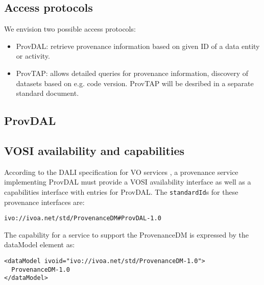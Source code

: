 \subsection{Access protocols}
\label{sec:access_protocols}
We envision two possible access protocols:
\begin{itemize}
\item ProvDAL: retrieve provenance information based on given ID of a data entity or activity.
\item ProvTAP: allows detailed queries for provenance information, discovery of datasets based on e.g. code version. ProvTAP will be desribed in a separate standard document.
\end{itemize}

\subsection{ProvDAL}


\subsection{VOSI availability and capabilities}
According to the DALI specification for VO services \citep{std:DALI}, a provenance service implementing ProvDAL must provide a VOSI availability interface as well as a capabilities interface with entries for ProvDAL. The \texttt{standardId}s for these provenance interfaces are:

\begin{verbatim}
ivo://ivoa.net/std/ProvenanceDM#ProvDAL-1.0
\end{verbatim}

The capability for a service to support the ProvenanceDM is expressed by
the dataModel element as:
\begin{verbatim}
<dataModel ivoid="ivo://ivoa.net/std/ProvenanceDM-1.0">
  ProvenanceDM-1.0
</dataModel>
\end{verbatim}



